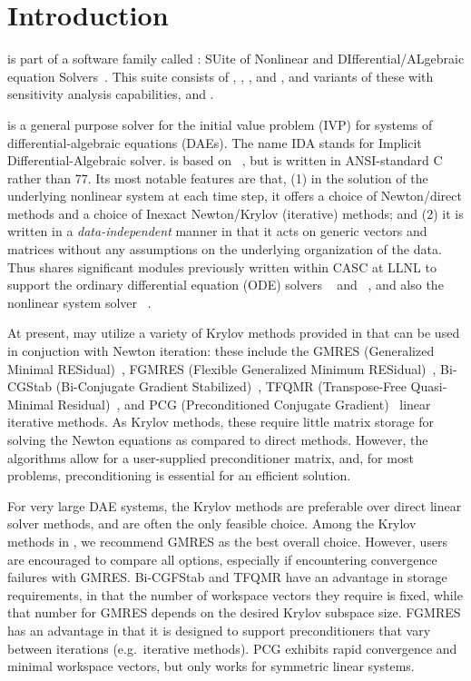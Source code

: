 \chapter{Introduction}\label{s:intro}

{\ida} is part of a software family called {\sundials}: 
SUite of Nonlinear and DIfferential/ALgebraic equation Solvers~\cite{HBGLSSW:05}. 
This suite consists of {\cvode}, {\arkode}, {\kinsol}, and {\ida}, and variants
of these with sensitivity analysis capabilities, {\cvodes} and {\idas}.

{\ida} is a general purpose solver for the initial value problem (IVP) for
systems of differential-algebraic equations (DAEs).  The name IDA
stands for Implicit Differential-Algebraic solver.  {\ida} is based on
{\daspk}~\cite{BHP:94,BHP:98}, but is written in ANSI-standard C
rather than {\F}77.
Its most notable features are that,
(1) in the solution of the underlying nonlinear system at each time
step, it offers a choice of Newton/direct methods and a choice of
Inexact Newton/Krylov (iterative) methods; and
(2) it is written in a {\em data-independent} manner in that it acts
on generic vectors and matrices without any assumptions on the
underlying organization of the data.
Thus {\ida} shares significant modules previously
written within CASC at LLNL to support the ordinary differential
equation (ODE) solvers {\cvode}~\cite{cvode_ug,CoHi:96} and 
{\pvode}~\cite{ByHi:98,ByHi:99}, and also the nonlinear system solver 
{\kinsol}~\cite{kinsol_ug}.

At present, {\ida} may utilize a variety of Krylov methods provided
in {\sundials} that can be used in conjuction with Newton iteration:
these include the GMRES (Generalized Minimal RESidual)~\cite{SaSc:86},
FGMRES (Flexible Generalized Minimum RESidual)~\cite{Saa:93},
Bi-CGStab (Bi-Conjugate Gradient Stabilized)~\cite{Van:92}, TFQMR
(Transpose-Free Quasi-Minimal Residual)~\cite{Fre:93}, and PCG
(Preconditioned Conjugate Gradient)~\cite{HeSt:52} linear iterative
methods.  As Krylov methods, these require little  
matrix storage for solving the Newton equations as compared to direct 
methods. However, the algorithms allow for a user-supplied preconditioner
matrix, and, for most problems, preconditioning is essential for an
efficient solution.

For very large DAE systems, the Krylov methods are preferable over
direct linear solver methods, and are often the only feasible choice.
Among the Krylov methods in {\sundials}, we recommend GMRES as the
best overall choice.  However, users are encouraged to compare all
options, especially if encountering convergence failures with GMRES.
Bi-CGFStab and TFQMR have an advantage in storage requirements, in
that the number of workspace vectors they require is fixed, while that
number for GMRES depends on the desired Krylov subspace size.  FGMRES
has an advantage in that it is designed to support preconditioners
that vary between iterations (e.g.~iterative methods).  PCG exhibits
rapid convergence and minimal workspace vectors, but only works for
symmetric linear systems.

